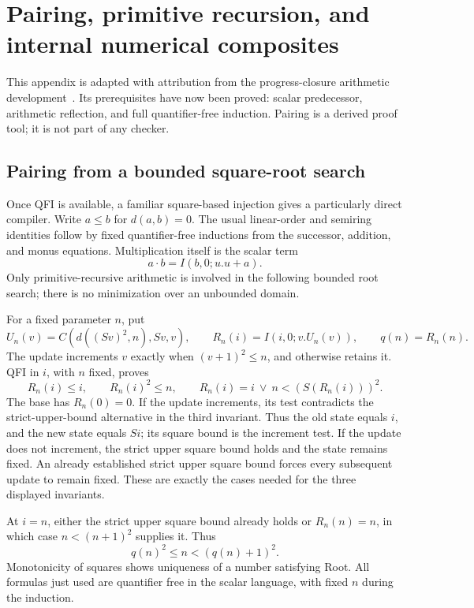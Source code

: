 \section{Pairing, primitive recursion, and internal numerical composites}
\label{sec:iterator-coding}
This appendix is adapted with attribution from the progress-closure
arithmetic development~\cite{progress}. Its prerequisites have now been
proved: scalar predecessor, arithmetic reflection, and full quantifier-free
induction. Pairing is a derived proof tool; it is not part of any checker.

\subsection{Pairing from a bounded square-root search}

Once QFI is available, a familiar square-based injection gives a
particularly direct compiler. Write $a\le b$ for $d(a,b)=0$.
The usual linear-order and semiring identities follow by fixed
quantifier-free inductions from the successor, addition, and monus
equations. Multiplication itself is the scalar term
\[
                        a\cdot b=I(b,0;u.u+a).
\]
Only primitive-recursive arithmetic is involved in the following
bounded root search; there is no minimization over an unbounded domain.

For a fixed parameter $n$, put
\[
 U_n(v)=C(d((Sv)^2,n),Sv,v),\qquad
 R_n(i)=I(i,0;v.U_n(v)),\qquad q(n)=R_n(n).
\]
The update increments $v$ exactly when $(v+1)^2\le n$, and
otherwise retains it. QFI in $i$, with $n$ fixed, proves
\[
 R_n(i)\le i,\qquad R_n(i)^2\le n,\qquad
 R_n(i)=i\ \vee\ n<(S(R_n(i)))^2.              \tag{Root invariant}
\]
The base has $R_n(0)=0$. If the update increments, its test
contradicts the strict-upper-bound alternative in the third invariant.
Thus the old state equals $i$, and the new state equals $Si$;
its square bound is the increment test. If the update does not increment, the
strict upper square bound holds and the state remains fixed.
An already established strict upper square bound forces every
subsequent update to remain fixed. These are exactly the cases
needed for the three displayed invariants.

At $i=n$, either the strict upper square bound already holds or
$R_n(n)=n$, in which case $n<(n+1)^2$ supplies it. Thus
\[
                        q(n)^2\le n<(q(n)+1)^2.           \tag{Root}
\]
Monotonicity of squares shows uniqueness of a number satisfying
Root. All formulas just used are quantifier free in the scalar
language, with fixed $n$ during the induction.

